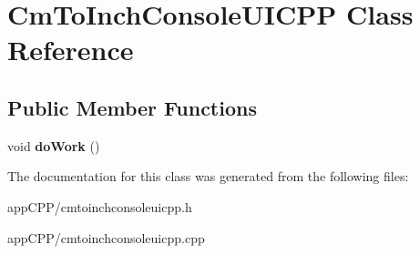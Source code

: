 \hypertarget{classCmToInchConsoleUICPP}{\section{Cm\-To\-Inch\-Console\-U\-I\-C\-P\-P Class Reference}
\label{classCmToInchConsoleUICPP}
}
\subsection*{Public Member Functions}
\begin{DoxyCompactItemize}
\item 
\hypertarget{classCmToInchConsoleUICPP_a751dbd50f09391ebad00398c67c73b31}{void {\bfseries do\-Work} ()}\label{classCmToInchConsoleUICPP_a751dbd50f09391ebad00398c67c73b31}

\end{DoxyCompactItemize}


The documentation for this class was generated from the following files\-:\begin{DoxyCompactItemize}
\item 
app\-C\-P\-P/cmtoinchconsoleuicpp.\-h\item 
app\-C\-P\-P/cmtoinchconsoleuicpp.\-cpp\end{DoxyCompactItemize}
